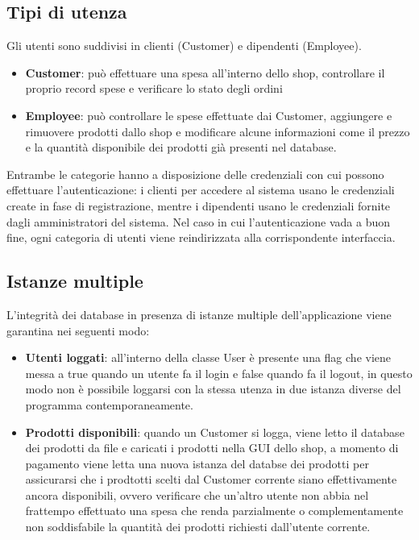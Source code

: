 \documentclass[12pt]{article}
\begin{document}
\subsection{Tipi di utenza}
Gli utenti sono suddivisi in clienti (Customer) e dipendenti (Employee).
\begin{itemize}
\item \textbf{Customer}: può effettuare una spesa all'interno dello shop, controllare il proprio record spese e verificare lo stato degli ordini
\item \textbf{Employee}: può controllare le spese effettuate dai Customer, aggiungere e rimuovere prodotti dallo shop e modificare alcune informazioni come il prezzo e la quantità disponibile dei prodotti già presenti nel database.
\end{itemize}

Entrambe le categorie hanno a disposizione delle credenziali con cui possono effettuare l’autenticazione: i clienti per accedere al sistema usano le credenziali create in fase di registrazione, mentre i dipendenti usano le credenziali fornite dagli amministratori del sistema. Nel caso in cui l’autenticazione vada a buon fine, ogni categoria di utenti viene reindirizzata alla corrispondente interfaccia.

\subsection{Istanze multiple}
L'integrità dei database in presenza di istanze multiple dell'applicazione viene garantina nei seguenti modo:
\begin{itemize}
\item \textbf{Utenti loggati}: all'interno della classe User è presente una flag che viene messa a true quando un utente fa il login e false quando fa il logout, in questo modo non è possibile loggarsi con la stessa utenza in due istanza diverse del programma contemporaneamente.
\item \textbf{Prodotti disponibili}: quando un Customer si logga, viene letto il database dei prodotti da file e caricati i prodotti nella GUI dello shop, a momento di pagamento viene letta una nuova istanza del databse dei prodotti per assicurarsi che i prodtotti scelti dal Customer corrente siano effettivamente ancora disponibili, ovvero verificare che un'altro utente non abbia nel frattempo effettuato una spesa che renda parzialmente o complementamente non soddisfabile la quantità dei prodotti richiesti dall'utente corrente.
\end{itemize}
\end{document}
